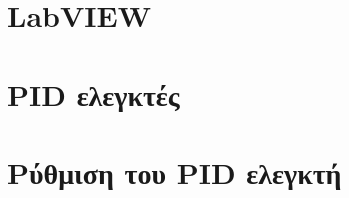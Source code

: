 \documentclass[a4paper,11pt,twoside]{book}
\author{\me}
\begin{document}
\setcounter{page}{3}



\clearemptydoublepage



\clearemptydoublepage



\clearemptydoublepage



\clearemptydoublepage



\clearemptydoublepage

\pagestyle{fancy}

\tableofcontents
\clearemptydoublepage

\setcounter{page}{1}


\clearemptydoublepage

\chapter{LabVIEW}\label{ch:chap1}

\clearemptydoublepage

\chapter{PID ελεγκτές}\label{ch:chap2}

\clearemptydoublepage

\chapter{Ρύθμιση του PID ελεγκτή}\label{ch:chap3}

\clearemptydoublepage


\clearemptydoublepage


\end{document}
